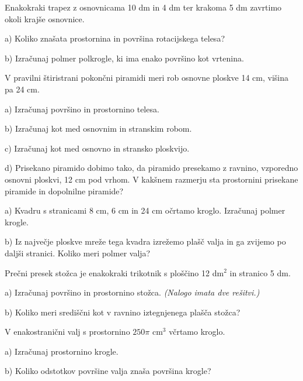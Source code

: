 \documentclass[a4paper,11pt]{letter}
\begin{document}
\begin{naloga}
Enakokraki trapez z osnovnicama 10 dm in 4 dm ter krakoma 5 dm zavrtimo okoli krajše osnovnice.

a) Koliko znašata prostornina in površina rotacijskega telesa?

b) Izračunaj polmer polkrogle, ki ima enako površino kot vrtenina.
\end{naloga}

\begin{naloga}
V pravilni štiristrani pokončni piramidi meri rob osnovne ploskve 14 cm, višina pa 24 cm.

a) Izračunaj površino in prostornino telesa.

b) Izračunaj kot med osnovnim in stranskim robom.

c) Izračunaj kot med osnovno in stransko ploskvijo.

d) Prisekano piramido dobimo tako, da piramido presekamo z ravnino, vzporedno osnovni ploskvi,
12 cm pod vrhom. V kakšnem razmerju sta prostornini prisekane piramide in dopolnilne piramide?
\end{naloga}

\begin{naloga}
a) Kvadru s stranicami 8 cm, 6 cm in 24 cm očrtamo kroglo. Izračunaj polmer krogle.

b) Iz največje ploskve mreže tega kvadra izrežemo plašč valja in ga zvijemo po daljši stranici.
Koliko meri polmer valja?
\end{naloga}

\begin{naloga}
Prečni presek stožca je enakokraki trikotnik s ploščino 12 dm$^2$ in stranico 5 dm.

a) Izračunaj površino in prostornino stožca. \emph{(Nalogo imata dve rešitvi.)}

b) Koliko meri središčni kot v ravnino iztegnjenega plašča stožca?
\end{naloga}

\begin{naloga}
V enakostranični valj s prostornino $250\pi$ cm$^3$ včrtamo kroglo.

a) Izračunaj prostornino krogle.

b) Koliko odstotkov površine valja znaša površina krogle?
\end{naloga}
\end{document}
